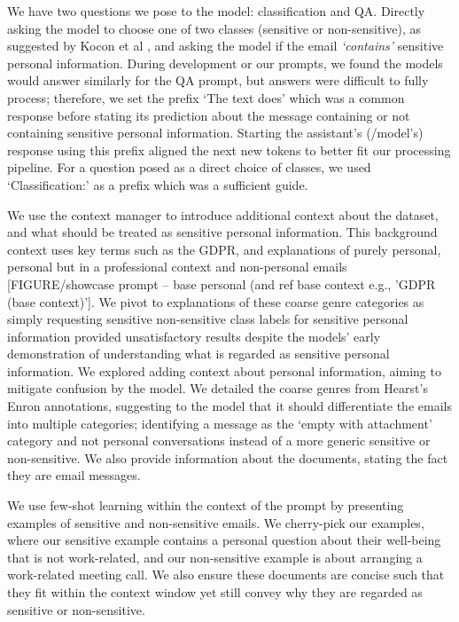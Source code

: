 We have two questions we pose to the model: classification and QA. Directly asking the model to choose one of two classes (sensitive or non-sensitive), as suggested by Kocon et al \cite{kocon2023chatgpt}, and asking the model if the email \emph{`contains'} sensitive personal information. During development or our prompts, we found the models would answer similarly for the QA prompt, but answers were difficult to fully process; therefore, we set the prefix ‘The text does’ which was a common response before stating its prediction about the message containing or not containing sensitive personal information. Starting the assistant’s (/model’s) response using this prefix aligned the next new tokens to better fit our processing pipeline. For a question posed as a direct choice of classes, we used `Classification:' as a prefix which was a sufficient guide.

We use the context manager to introduce additional context about the dataset, and what should be treated as sensitive personal information. This background context uses key terms such as the GDPR, and explanations of purely personal, personal but in a professional context and non-personal emails [FIGURE/showcase prompt – base personal (and ref base context e.g., 'GDPR (base context)']. We pivot to explanations of these coarse genre categories as simply requesting sensitive non-sensitive class labels for sensitive personal information provided unsatisfactory results despite the models' early demonstration of understanding what is regarded as sensitive personal information. We explored adding context about personal information, aiming to mitigate confusion by the model. We detailed the coarse genres from Hearst’s Enron annotations, suggesting to the model that it should differentiate the emails into multiple categories; identifying a message as the ‘empty with attachment’ category and not personal conversations instead of a more generic sensitive or non-sensitive. We also provide information about the documents, stating the fact they are email messages.

We use few-shot learning within the context of the prompt by presenting examples of sensitive and non-sensitive emails. We cherry-pick our examples, where our sensitive example contains a personal question about their well-being that is not work-related, and our non-sensitive example is about arranging a work-related meeting call. We also ensure these documents are concise such that they fit within the context window yet still convey why they are regarded as sensitive or non-sensitive.

